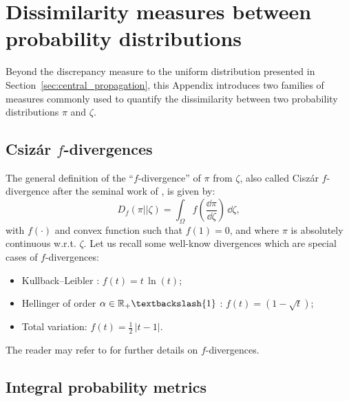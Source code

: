 \cleardoublepage
\chapter{Dissimilarity measures between probability distributions}
\label{apx:B}

Beyond the discrepancy measure to the uniform distribution presented in Section~\ref{sec:central_propagation}, this Appendix introduces two families of measures commonly used to quantify the dissimilarity between two probability distributions $\pi$ and $\zeta$.  


\section*{Csiz\'{a}r $f$-divergences}

The general definition of the ``$f$-divergence'' of $\pi$ from $\zeta$, also called Cisz\'{a}r $f$-divergence after the seminal work of \citet{csiszar_1964}, is given by: 
\begin{equation}
    D_{f}\left(\pi || \zeta\right) = \int_{\Omega} f\left(\frac{\dd \pi}{\dd \zeta}\right) \, \dd \zeta, 
\end{equation}
with $f(\cdot)$ and convex function such that $f(1)=0$, and where $\pi$ is absolutely continuous w.r.t. $\zeta$. 
Let us recall some well-know divergences which are special cases of $f$-divergences:
\begin{itemize}
    \item Kullback–Leibler \citep{kullback_1951}: $f(t)=t \, \ln(t)$;
    \item Hellinger of order $\alpha \in \R_+ \textbackslash \{1\}$ \citep{jeffreys_1946}: $f(t)=(1 - \sqrt{t})$;
    \item Total variation: $f(t)= \frac12 \, |t-1|$.
\end{itemize} 
The reader may refer to \citet{basu_2011} for further details on $f$-divergences.


\section*{Integral probability metrics}

